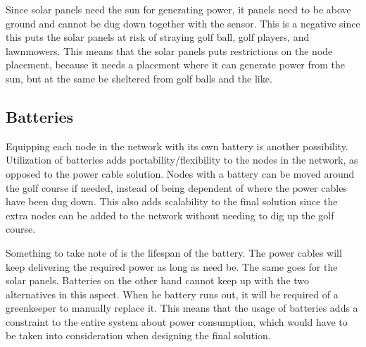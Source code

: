Since solar panels need the sun for generating power, it panels need to be above ground and cannot be dug down together with the sensor. This is a negative since this puts the solar panels at risk of straying golf ball, golf players, and lawnmowers. This means that the solar panels puts restrictions on the node placement, because it needs a placement where it can generate power from the sun, but at the same be sheltered from golf balls and the like.

\subsection*{Batteries}
Equipping each node in the network with its own battery is another possibility. Utilization of batteries adds portability/flexibility to the nodes in the network, as opposed to the power cable solution. Nodes with a battery can be moved around the golf course if needed, instead of being dependent of where the power cables have been dug down. This also adds scalability to the final solution since the extra nodes can be added to the network without needing to dig up the golf course.

Something to take note of is the lifespan of the battery. The power cables will keep delivering the required power as long as need be. The same goes for the solar panels. Batteries on the other hand cannot keep up with the two alternatives in this aspect. When he battery runs out, it will be required of a greenkeeper to manually replace it. This means that the usage of batteries adds a constraint to the entire system about power consumption, which would have to be taken into consideration when designing the final solution.


